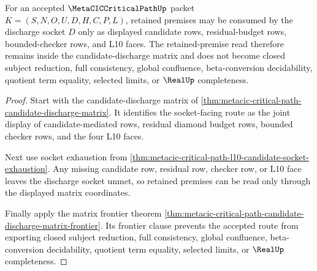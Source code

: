 \begin{theorem}
\label{thm:metacic-critical-path-retained-premise-discharge-boundary}
For an accepted $\MetaCICCriticalPathUp$ packet $K=(S,N,O,U,D,H,C,P,L)$, retained premises may be consumed by the discharge socket $D$ only as displayed candidate rows, residual-budget rows, bounded-checker rows, and L10 faces. The retained-premise read therefore remains inside the candidate-discharge matrix and does not become closed subject reduction, full consistency, global confluence, beta-conversion decidability, quotient term equality, selected limits, or $\RealUp$ completeness.
\end{theorem}
\begin{proof}
Start with the candidate-discharge matrix of \autoref{thm:metacic-critical-path-candidate-discharge-matrix}. It identifies the socket-facing route as the joint display of candidate-mediated rows, residual diamond budget rows, bounded checker rows, and the four L10 faces.

Next use socket exhaustion from \autoref{thm:metacic-critical-path-l10-candidate-socket-exhaustion}. Any missing candidate row, residual row, checker row, or L10 face leaves the discharge socket unmet, so retained premises can be read only through the displayed matrix coordinates.

Finally apply the matrix frontier theorem \autoref{thm:metacic-critical-path-candidate-discharge-matrix-frontier}. Its frontier clause prevents the accepted route from exporting closed subject reduction, full consistency, global confluence, beta-conversion decidability, quotient term equality, selected limits, or $\RealUp$ completeness.
\end{proof}
